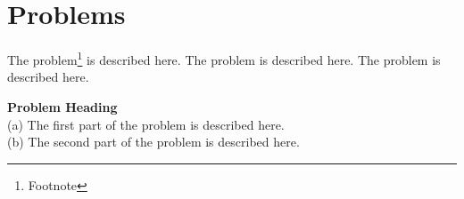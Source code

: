 \section*{Problems}
%
\begin{prob}
\label{prob1}
The problem\footnote{Footnote} is described here. The
problem is described here. The problem is described here.
\end{prob}

\begin{prob}
\label{prob2}
\textbf{Problem Heading}\\
(a) The first part of the problem is described here.\\
(b) The second part of the problem is described here.
\end{prob}



%
